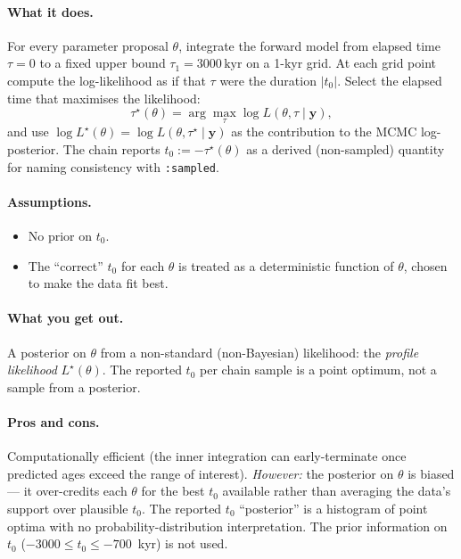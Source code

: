 \documentclass[11pt,a4paper]{article}
\newcommand{\tzero}{\ensuremath{t_{0}}}
\newcommand{\code}[1]{\texttt{#1}}
\begin{document}
\paragraph{What it does.}
For every parameter proposal $\theta$, integrate the forward model from
elapsed time $\tau=0$ to a fixed upper bound $\tau_1=3000\,\mathrm{kyr}$ on
a 1-kyr grid. At each grid point compute the log-likelihood as if that
$\tau$ were the duration $|\tzero|$. Select the elapsed time that maximises
the likelihood:
\begin{equation}
\tau^{\star}(\theta) = \arg\max_{\tau}\log L(\theta, \tau \mid \mathbf{y}),
\end{equation}
and use $\log L^{\star}(\theta) = \log L(\theta, \tau^{\star} \mid \mathbf{y})$
as the contribution to the MCMC log-posterior. The chain reports
$\tzero := -\tau^{\star}(\theta)$ as a derived (non-sampled) quantity for
naming consistency with \code{:sampled}.

\paragraph{Assumptions.}
\begin{itemize}
  \item No prior on \tzero{}.
  \item The ``correct'' \tzero{} for each $\theta$ is treated as a
        deterministic function of $\theta$, chosen to make the data fit best.
\end{itemize}

\paragraph{What you get out.}
A posterior on $\theta$ from a non-standard (non-Bayesian) likelihood: the
\emph{profile likelihood} $L^{\star}(\theta)$. The reported $\tzero$ per
chain sample is a point optimum, not a sample from a posterior.

\paragraph{Pros and cons.}
Computationally efficient (the inner integration can early-terminate once
predicted ages exceed the range of interest). \textit{However:} the
posterior on $\theta$ is biased --- it over-credits each $\theta$ for the
best $\tzero$ available rather than averaging the data's support over
plausible \tzero{}. The reported $\tzero$ ``posterior'' is a histogram of
point optima with no probability-distribution interpretation. The prior
information on \tzero{} ($-3000 \leq \tzero \leq -700$~kyr) is not used.
\end{document}
